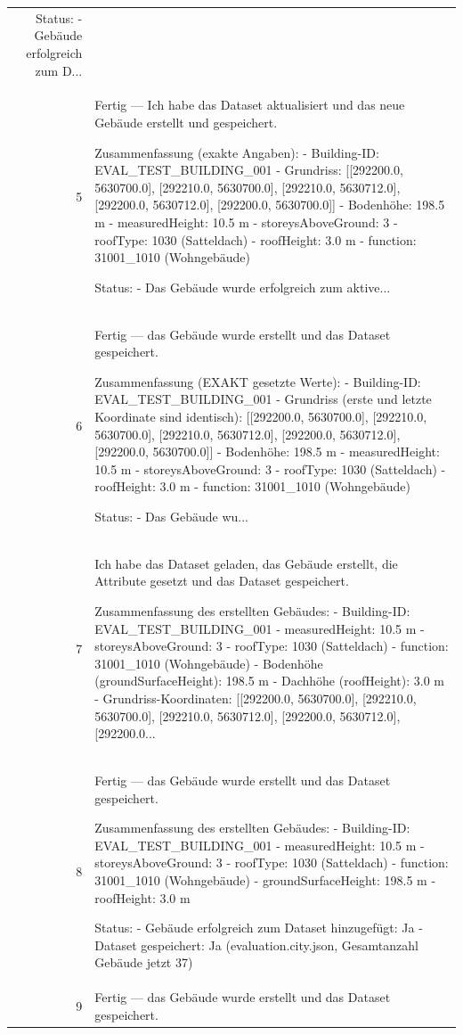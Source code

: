 \documentclass[a4paper,11pt]{article}
\begin{document}
\begin{table}[ht]
\begin{tabular}{r p{12cm}}
Status:
- Gebäude erfolgreich zum D... \\
5 & Fertig — Ich habe das Dataset aktualisiert und das neue Gebäude erstellt und gespeichert.

Zusammenfassung (exakte Angaben):
- Building-ID: EVAL\_TEST\_BUILDING\_001
- Grundriss: [[292200.0, 5630700.0], [292210.0, 5630700.0], [292210.0, 5630712.0], [292200.0, 5630712.0], [292200.0, 5630700.0]]
- Bodenhöhe: 198.5 m
- measuredHeight: 10.5 m
- storeysAboveGround: 3
- roofType: 1030 (Satteldach)
- roofHeight: 3.0 m
- function: 31001\_1010 (Wohngebäude)

Status:
- Das Gebäude wurde erfolgreich zum aktive... \\
6 & Fertig — das Gebäude wurde erstellt und das Dataset gespeichert.

Zusammenfassung (EXAKT gesetzte Werte):
- Building-ID: EVAL\_TEST\_BUILDING\_001
- Grundriss (erste und letzte Koordinate sind identisch): [[292200.0, 5630700.0], [292210.0, 5630700.0], [292210.0, 5630712.0], [292200.0, 5630712.0], [292200.0, 5630700.0]]
- Bodenhöhe: 198.5 m
- measuredHeight: 10.5 m
- storeysAboveGround: 3
- roofType: 1030 (Satteldach)
- roofHeight: 3.0 m
- function: 31001\_1010 (Wohngebäude)

Status:
- Das Gebäude wu... \\
7 & Ich habe das Dataset geladen, das Gebäude erstellt, die Attribute gesetzt und das Dataset gespeichert.

Zusammenfassung des erstellten Gebäudes:
- Building-ID: EVAL\_TEST\_BUILDING\_001
- measuredHeight: 10.5 m
- storeysAboveGround: 3
- roofType: 1030 (Satteldach)
- function: 31001\_1010 (Wohngebäude)
- Bodenhöhe (groundSurfaceHeight): 198.5 m
- Dachhöhe (roofHeight): 3.0 m
- Grundriss-Koordinaten: [[292200.0, 5630700.0], [292210.0, 5630700.0], [292210.0, 5630712.0], [292200.0, 5630712.0], [292200.0... \\
8 & Fertig — das Gebäude wurde erstellt und das Dataset gespeichert.

Zusammenfassung des erstellten Gebäudes:
- Building-ID: EVAL\_TEST\_BUILDING\_001
- measuredHeight: 10.5 m
- storeysAboveGround: 3
- roofType: 1030 (Satteldach)
- function: 31001\_1010 (Wohngebäude)
- groundSurfaceHeight: 198.5 m
- roofHeight: 3.0 m

Status:
- Gebäude erfolgreich zum Dataset hinzugefügt: Ja
- Dataset gespeichert: Ja (evaluation.city.json, Gesamtanzahl Gebäude jetzt 37) \\
9 & Fertig — das Gebäude wurde erstellt und das Dataset gespeichert.


\end{tabular}
\end{table}
\end{document}

